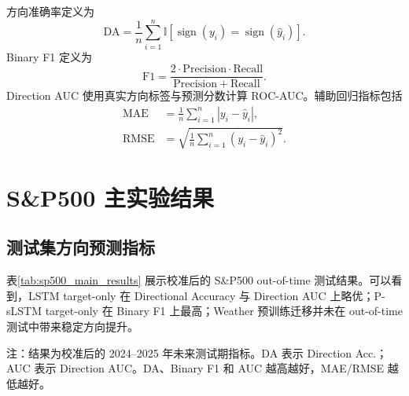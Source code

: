 \documentclass[UTF8,zihao=-4,twocolumn,fontset=fandol]{ctexart}
\begin{document}
方向准确率定义为
\begin{equation}
  \mathrm{DA}=\frac{1}{n}\sum_{i=1}^{n}\mathbb{I}\left[\operatorname{sign}(y_i)=\operatorname{sign}(\hat y_i)\right].
\end{equation}
Binary F1 定义为
\begin{equation}
  \mathrm{F1}=\frac{2\cdot \mathrm{Precision}\cdot \mathrm{Recall}}{\mathrm{Precision}+\mathrm{Recall}}.
\end{equation}
Direction AUC 使用真实方向标签与预测分数计算 ROC-AUC。辅助回归指标包括
\begin{align}
  \mathrm{MAE}&=\frac{1}{n}\sum_{i=1}^{n}|y_i-\hat y_i|,\\
  \mathrm{RMSE}&=\sqrt{\frac{1}{n}\sum_{i=1}^{n}(y_i-\hat y_i)^2}.
\end{align}

\section{S\&P500 主实验结果}

\subsection{测试集方向预测指标}

表\ref{tab:sp500_main_results} 展示校准后的 S\&P500 out-of-time 测试结果。可以看到，LSTM target-only 在 Directional Accuracy 与 Direction AUC 上略优；P-sLSTM target-only 在 Binary F1 上最高；Weather 预训练迁移并未在 out-of-time 测试中带来稳定方向提升。

\begin{table}[H]
\centering
\caption{S\&P500 out-of-time 测试结果}
\label{tab:sp500_main_results}
{
\setlength{\tabcolsep}{2.2pt}
\par
\vspace{2pt}
\parbox{\columnwidth}{注：结果为校准后的 2024--2025 年未来测试期指标。DA 表示 Direction Acc.；AUC 表示 Direction AUC。DA、Binary F1 和 AUC 越高越好，MAE/RMSE 越低越好。}
}
\end{table}
\end{document}
